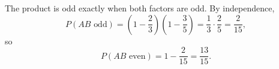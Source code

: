The product is odd exactly when both factors are odd. By independence,
\[
P(AB\text{ odd})=\left(1-\dfrac{2}{3}\right)\left(1-\dfrac{3}{5}\right)=\dfrac{1}{3}\cdot\dfrac{2}{5}=\dfrac{2}{15},
\]
so
\[
P(AB\text{ even})=1-\dfrac{2}{15}=\boxed{\dfrac{13}{15}}.
\]

